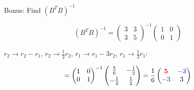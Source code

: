 \documentclass[10pt]{beamer}
\theoremstyle{definition}
\newcommand{\pvt}[1]{{\color{red}\mathbf{#1}}}       %
\newcommand{\crs}[1]{{\color{blue}#1}}                %
\begin{document}
\begin{frame}{Bonus: Find $(B^TB)^{-1}$}

$$(B^TB)^{-1} = \begin{pmatrix} 3 & 3 \\ 3 & 5 \end{pmatrix}^{-1}\begin{pmatrix} 1 & 0 \\ 0 & 1 \end{pmatrix}$$

$r_2 \to r_2 - r_1$, \; $r_2 \to \frac{1}{2}r_2$, \; $r_1 \to r_1 - 3r_2$, \; $r_1 \to \frac{1}{3}r_1$:

$$= \begin{pmatrix} 1 & 0 \\ 0 & 1 \end{pmatrix}^{-1}\begin{pmatrix} \frac{5}{6} & -\frac{1}{2} \\[3pt] -\frac{1}{2} & \frac{1}{2} \end{pmatrix} = \frac{1}{6}\begin{pmatrix} \pvt{5} & \crs{-3} \\ \crs{-3} & 3 \end{pmatrix}$$

\end{frame}
\end{document}
